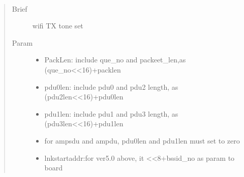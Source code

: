 \documentclass[letterpaper,10pt,english]{sphinxhowto}
\begin{document}
\begin{fulllineitems}
\begin{fulllineitems}
\begin{quote}
\begin{description}
\end{description}\end{quote}

\end{fulllineitems}


\begin{fulllineitems}
\label{\detokenize{rfapi/index:wifi_api.WIFIAPI.filltxpacket}}~\begin{quote}\begin{description}
\item[{Brief}] \leavevmode
wifi TX tone set

\item[{Param}] \leavevmode\begin{itemize}
\item {} 
PackLen: include que\_no and packeet\_len,as (que\_no\textless{}\textless{}16)+packlen

\item {} 
pdu0len: include pdu0 and pdu2 length, as (pdu2len\textless{}\textless{}16)+pdu0len

\item {} 
pdu1len: include pdu1 and pdu3 length, as (pdu3len\textless{}\textless{}16)+pdu1len

\item {} 
for ampsdu and ampdu, pdu0len and pdu1len must set to zero

\item {} 
lnkstartaddr:for ver5.0 above, it \textless{}\textless{}8+bssid\_no as param to board

\end{itemize}

\end{description}\end{quote}

\end{fulllineitems}


\begin{fulllineitems}
\label{\detokenize{rfapi/index:wifi_api.WIFIAPI.get_rx_tone_pwr}}
\end{fulllineitems}


\end{fulllineitems}
\end{document}
